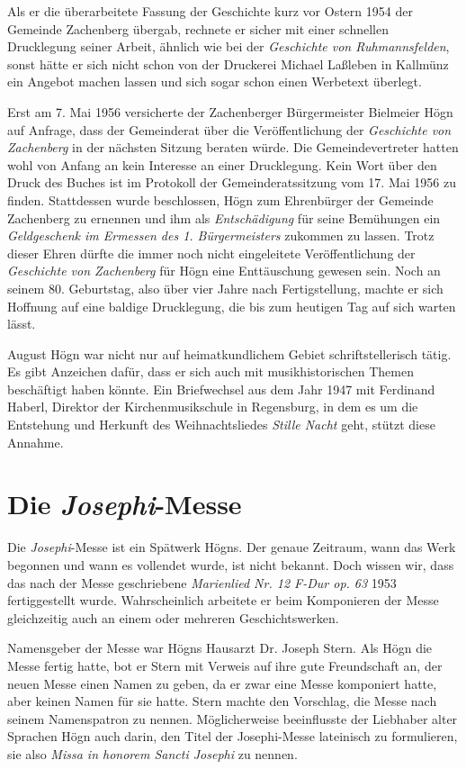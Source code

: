 \documentclass{book}
\newcommand{\zitat}[1]{\textit{#1}}
\begin{document}
Als er die überarbeitete Fassung der Geschichte kurz vor Ostern 1954 der
Gemeinde Zachenberg übergab, rechnete er sicher mit einer schnellen
Druck\-legung seiner Arbeit, ähnlich wie bei der \textit{Geschichte von
Ruhmannsfelden}, sonst hätte er sich nicht schon von der Druckerei
Michael Laßleben in Kallmünz ein Angebot machen lassen und sich sogar
schon einen Werbetext überlegt.

Erst am 7. Mai 1956 versicherte der Zachenberger Bürgermeister Bielmeier
Högn auf Anfrage, dass der Gemeinderat über die Veröffentlichung der
\textit{Ge\-schichte von Zachenberg} in der nächsten Sitzung beraten
würde. Die Gemeinde\-vertreter hatten wohl von Anfang an kein Interesse
an einer Drucklegung. Kein Wort über den Druck des Buches ist im
Protokoll der Gemeinderats\-sitzung vom 17. Mai 1956 zu finden.
Stattdessen wurde beschlossen, Högn zum Ehrenbürger der Gemeinde
Zachenberg zu ernennen und ihm als \zitat{Ent\-schädigung
}für seine Bemühungen ein \zitat{Geldgeschenk im Ermessen des
1. Bürgermei\-sters} zukommen zu lassen. Trotz dieser Ehren dürfte die
immer noch nicht eingeleitete Veröffentlichung der \textit{Geschichte
von Zachenberg} für Högn eine Ent\-täuschung gewesen sein. Noch an
seinem 80. Geburtstag, also über vier Jahre nach Fertigstellung, machte
er sich Hoffnung auf eine baldige Drucklegung, die bis zum heutigen Tag
auf sich warten lässt.

August Högn war nicht nur auf heimatkundlichem Gebiet schriftstellerisch
tätig. Es gibt Anzeichen dafür, dass er sich auch mit musikhistorischen
The\-men beschäftigt haben könnte. Ein Briefwechsel aus dem Jahr 1947
mit Fer\-dinand Haberl, Direktor der Kirchenmusikschule in Regensburg,
in dem es um die Entstehung und Herkunft des Weihnachtsliedes
\textit{Stille Nacht} geht, stützt diese Annahme.

\section{Die \textit{Josephi}{}-Messe}

Die \textit{Josephi}{}-Messe ist ein Spätwerk Högns. Der genaue
Zeitraum, wann das Werk begonnen und wann es vollendet wurde, ist nicht
bekannt. Doch wissen wir, dass das nach der Messe geschriebene
\textit{Marienlied Nr. 12 F-Dur op. 63} 1953 fertiggestellt wurde.
Wahrscheinlich arbeitete er beim Komponieren der Messe gleichzeitig
auch an einem oder mehreren Geschichtswerken.

Namensgeber der Messe war Högns Hausarzt Dr. Joseph Stern. Als Högn die
Messe fertig hatte, bot er Stern mit Verweis auf ihre gute Freundschaft
an, der neuen Messe einen Namen zu geben, da er zwar eine Messe
komponiert hatte, aber keinen Namen für sie hatte. Stern machte den
Vorschlag, die Messe nach seinem Namenspatron zu nennen. Möglicherweise
beeinflusste der Liebhaber alter Sprachen Högn auch darin, den Titel
der Josephi-Messe lateinisch zu formulieren, sie also \textit{Missa in
honorem Sancti Josephi} zu nennen.
\end{document}
